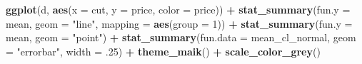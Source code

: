 \documentclass[
    numbers=noenddot,
    open=any,
    paper=a4,
    oneside,
    pagesize,
    captions=tableabove,
    bibliography=totoc,
    11pt
    ]{scrbook}
\newenvironment{Shaded}{\begin{snugshade}}{\end{snugshade}}
\newcommand{\DataTypeTok}[1]{\textcolor[rgb]{0.13,0.29,0.53}{#1}}
\newcommand{\DecValTok}[1]{\textcolor[rgb]{0.00,0.00,0.81}{#1}}
\newcommand{\FloatTok}[1]{\textcolor[rgb]{0.00,0.00,0.81}{#1}}
\newcommand{\KeywordTok}[1]{\textcolor[rgb]{0.13,0.29,0.53}{\textbf{#1}}}
\newcommand{\NormalTok}[1]{#1}
\newcommand{\OperatorTok}[1]{\textcolor[rgb]{0.81,0.36,0.00}{\textbf{#1}}}
\newcommand{\StringTok}[1]{\textcolor[rgb]{0.31,0.60,0.02}{#1}}
\begin{document}
\begin{Shaded}
\begin{Highlighting}[]
\KeywordTok{ggplot}\NormalTok{(d, }\KeywordTok{aes}\NormalTok{(}\DataTypeTok{x =}\NormalTok{ cut, }\DataTypeTok{y =}\NormalTok{ price, }\DataTypeTok{color =}\NormalTok{ price)) }\OperatorTok{+}
\StringTok{  }\KeywordTok{stat\_summary}\NormalTok{(}\DataTypeTok{fun.y =}\NormalTok{ mean, }\DataTypeTok{geom =} \StringTok{"line"}\NormalTok{, }\DataTypeTok{mapping =} \KeywordTok{aes}\NormalTok{(}\DataTypeTok{group =} \DecValTok{1}\NormalTok{)) }\OperatorTok{+}
\StringTok{  }\KeywordTok{stat\_summary}\NormalTok{(}\DataTypeTok{fun.y =}\NormalTok{ mean, }\DataTypeTok{geom =} \StringTok{"point"}\NormalTok{) }\OperatorTok{+}
\StringTok{  }\KeywordTok{stat\_summary}\NormalTok{(}\DataTypeTok{fun.data =}\NormalTok{ mean\_cl\_normal, }\DataTypeTok{geom =} \StringTok{"errorbar"}\NormalTok{, }\DataTypeTok{width =} \FloatTok{.25}\NormalTok{) }\OperatorTok{+}
\StringTok{  }\KeywordTok{theme\_maik}\NormalTok{() }\OperatorTok{+}
\StringTok{  }\KeywordTok{scale\_color\_grey}\NormalTok{()}
\end{Highlighting}
\end{Shaded}


    \printbibliography[heading=bibintoc]
\end{document}
